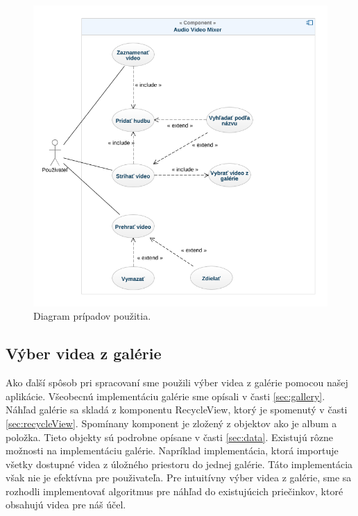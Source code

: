 \documentclass[12pt, oneside]{book}
\begin{document}
\begin{figure}[H]
    \centering
    \includegraphics[width=1\textwidth]{images/usecase-diagram.png}
    \caption{Diagram prípadov použitia. }
    \label{fig:obr06}
\end{figure}

\subsection{Výber videa z galérie}

\hspace{15pt}Ako ďalší spôsob pri spracovaní sme použili výber videa z galérie pomocou našej aplikácie. Všeobecnú implementáciu galérie sme opísali v časti \ref{sec:gallery}. Náhľad galérie sa skladá z komponentu RecycleView, ktorý je spomenutý v časti \ref{sec:recycleView}. Spomínany komponent je zložený z objektov ako je album a položka. Tieto objekty sú podrobne opísane v časti \ref{sec:data}. Existujú rôzne možnosti na implementáciu galérie. Napríklad implementácia, ktorá importuje všetky dostupné videa z úložného priestoru do jednej galérie. Táto implementácia však nie je efektívna pre použivateľa. Pre intuitívny výber videa z galérie, sme sa rozhodli implementovať algoritmus pre náhľad do existujúcich priečinkov, ktoré obsahujú videa pre náš účel. 
\end{document}
